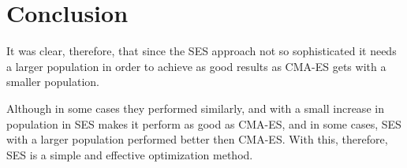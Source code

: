 \section {Conclusion}

It was clear, therefore, that since the SES approach not so sophisticated it needs a larger population in order to achieve as good results as CMA-ES gets with a smaller population.

Although in some cases they performed similarly, and with a small increase in population in SES makes it perform as good as CMA-ES, and in some cases, SES with a larger population performed better then CMA-ES. With this, therefore, SES is a simple and effective optimization method.

\vfill

